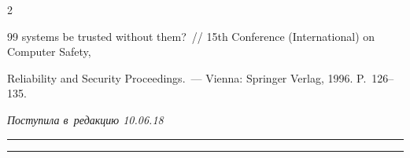 \begin{multicols}{2}
{{\begin{thebibliography}{99}
systems be trusted without them?~// 15th Conference (International) on Computer Safety, 


Reliability and Security Proceedings.~--- Vienna: Springer Verlag, 1996. P.~126--135.


     


 \end{thebibliography}





 }


 }





\end{multicols}





\vspace*{-3pt}





\hfill{\small\textit{Поступила в~редакцию 10.06.18}}





\vspace*{8pt}




















\hrule





\vspace*{2pt}





\hrule










\def\tit{USING A PROBABILISTIC CALCULATION MODEL TO~TEST\\ ONE CLASS 


OF~READY-TO-USE SOFTWARE COMPONENTS\\ OF~LOCAL AND~NETWORK SYSTEMS}






